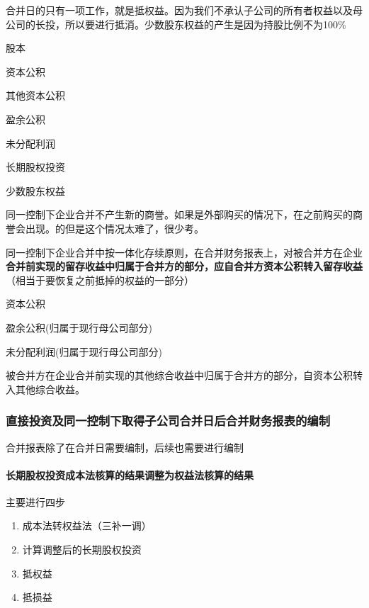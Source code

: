 \documentclass[UTF8,12pt]{ctexart}
\newenvironment{Dr}{%
	\begin{list}{}%
		{
			\setlength{\leftmargin}{2em}
			\setlength{\labelwidth}{2em}
			\setlength{\labelsep}{0pt}
			\setlength{\itemindent}{0pt}
			\setlength{\listparindent}{0pt}
			\setlength{\parsep}{0pt}
			\setlength{\topsep}{0pt}
		}
		\item[\textbf{借：}]
	}{%
	\end{list}
}
\newenvironment{Cr}{%
	\begin{list}{}%
		{
			\setlength{\leftmargin}{3em}
			\setlength{\labelwidth}{2em}
			\setlength{\labelsep}{0pt}
			\setlength{\itemindent}{0pt}
			\setlength{\listparindent}{0pt}
			\setlength{\parsep}{0pt}
			\setlength{\topsep}{0pt}
		}
		\item[\textbf{贷：}]
	}{%
	\end{list}
}
\numberwithin{equation}{section} %
\numberwithin{figure}{section}
\numberwithin{table}{section}
\begin{document}
	合并日的只有一项工作，就是抵权益。因为我们不承认子公司的所有者权益以及母公司的长投，所以要进行抵消。少数股东权益的产生是因为持股比例不为100\%
	\begin{Dr}
		股本
		
		资本公积
		
		其他资本公积
		
		盈余公积
		
		未分配利润
	\end{Dr}
	\begin{Cr}
		长期股权投资
		
		少数股东权益
	\end{Cr}
	
	
	
	同一控制下企业合并不产生新的商誉。如果是外部购买的情况下，在之前购买的商誉会出现。的但是这个情况太难了，很少考。
	
	同一控制下企业合并中按一体化存续原则，在合并财务报表上，对被合并方在企业\textbf{合并前实现的留存收益中归属于合并方的部分，应自合并方资本公积转入留存收益}（相当于要恢复之前抵掉的权益的一部分）
	\begin{Dr}
		资本公积
	\end{Dr}
	\begin{Cr}
		盈余公积(归属于现行母公司部分)
		
		未分配利润(归属于现行母公司部分)
	\end{Cr}
	
	被合并方在企业合并前实现的其他综合收益中归属于合并方的部分，自资本公积转入其他综合收益。
	\subsubsection{直接投资及同一控制下取得子公司合并日后合并财务报表的编制}
	合并报表除了在合并日需要编制，后续也需要进行编制
	\paragraph{长期股权投资成本法核算的结果调整为权益法核算的结果}
	主要进行四步
	\begin{enumerate}
		\item 成本法转权益法（三补一调）
		
		\item 计算调整后的长期股权投资
		
		\item 抵权益
		
		\item 抵损益
	\end{enumerate}
	
\end{document}
